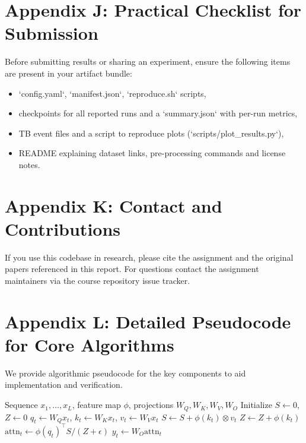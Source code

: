 \documentclass{article}
\begin{document}
\section{Appendix J: Practical Checklist for Submission}
Before submitting results or sharing an experiment, ensure the following items are present in your artifact bundle:
\begin{itemize}
  \item `config.yaml`, `manifest.json`, `reproduce.sh` scripts,
  \item checkpoints for all reported runs and a `summary.json` with per-run metrics,
  \item TB event files and a script to reproduce plots (`scripts/plot_results.py`),
  \item README explaining dataset links, pre-processing commands and license notes.
\end{itemize}

\section{Appendix K: Contact and Contributions}
If you use this codebase in research, please cite the assignment and the original papers referenced in this report. For questions contact the assignment maintainers via the course repository issue tracker.

\section{Appendix L: Detailed Pseudocode for Core Algorithms}
We provide algorithmic pseudocode for the key components to aid implementation and verification.

\begin{algorithm}
\caption{Online Linear Attention Update}
\begin{algorithmic}[1]
\Require Sequence $x_1, \dots, x_L$, feature map $\phi$, projections $W_Q, W_K, W_V, W_O$
\State Initialize $S \leftarrow 0$, $Z \leftarrow 0$ 
    \State $q_t \leftarrow W_Q x_t$, $k_t \leftarrow W_K x_t$, $v_t \leftarrow W_V x_t$
    \State $S \leftarrow S + \phi(k_t) \otimes v_t$ 
    \State $Z \leftarrow Z + \phi(k_t)$ 
    \State $\mathrm{attn}_t \leftarrow \phi(q_t)^\top S / (Z + \epsilon)$ 
    \State $y_t \leftarrow W_O \mathrm{attn}_t$
\EndFor
\end{algorithmic}
\end{algorithm}
\end{document}
